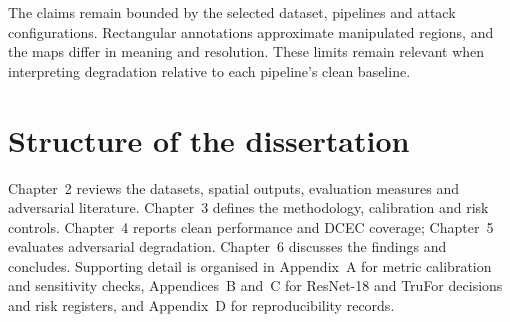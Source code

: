 The claims remain bounded by the selected dataset, pipelines and attack configurations. Rectangular annotations approximate manipulated regions, and the maps differ in meaning and resolution. These limits remain relevant when interpreting degradation relative to each pipeline's clean baseline.

\section{Structure of the dissertation}
\label{sec:intro-structure}

Chapter~2 reviews the datasets, spatial outputs, evaluation measures and adversarial literature. Chapter~3 defines the methodology, calibration and risk controls. Chapter~4 reports clean performance and DCEC coverage; Chapter~5 evaluates adversarial degradation. Chapter~6 discusses the findings and concludes. Supporting detail is organised in Appendix~A for metric calibration and sensitivity checks, Appendices~B and~C for ResNet-18 and TruFor decisions and risk registers, and Appendix~D for reproducibility records.
